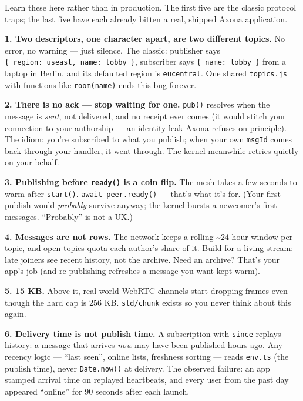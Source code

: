 \documentclass[
  nobib]{tufte-handout}
\begin{document}
Learn these here rather than in production. The first five are the
classic protocol traps; the last five have each already bitten a real,
shipped Axona application.

\textbf{1. Two descriptors, one character apart, are two different
topics.} No error, no warning --- just silence. The classic: publisher
says
\texttt{\{\ region:\ \textquotesingle{}useast\textquotesingle{},\ name:\ \textquotesingle{}lobby\textquotesingle{}\ \}},
subscriber says
\texttt{\{\ name:\ \textquotesingle{}lobby\textquotesingle{}\ \}} from a
laptop in Berlin, and its defaulted region is \texttt{eucentral}. One
shared \texttt{topics.js} with functions like \texttt{room(name)} ends
this bug forever.

\textbf{2. There is no ack --- stop waiting for one.} \texttt{pub()}
resolves when the message is \emph{sent}, not delivered, and no receipt
ever comes (it would stitch your connection to your authorship --- an
identity leak Axona refuses on principle). The idiom: you're subscribed
to what you publish; when your own \texttt{msgId} comes back through
your handler, it went through. The kernel meanwhile retries quietly on
your behalf.

\textbf{3. Publishing before \texttt{ready()} is a coin flip.} The mesh
takes a few seconds to warm after \texttt{start()}.
\texttt{await\ peer.ready()} --- that's what it's for. (Your first
publish would \emph{probably} survive anyway; the kernel bursts a
newcomer's first messages. ``Probably'' is not a UX.)

\textbf{4. Messages are not rows.} The network keeps a rolling
\textasciitilde24-hour window per topic, and open topics quota each
author's share of it. Build for a living stream: late joiners see recent
history, not the archive. Need an archive? That's your app's job (and
re-publishing refreshes a message you want kept warm).

\textbf{5. 15 KB.} Above it, real-world WebRTC channels start dropping
frames even though the hard cap is 256 KB. \texttt{std/chunk} exists so
you never think about this again.

\textbf{6. Delivery time is not publish time.} A subscription with
\texttt{since} replays history: a message that arrives \emph{now} may
have been published hours ago. Any recency logic --- ``last seen'',
online lists, freshness sorting --- reads \texttt{env.ts} (the publish
time), never \texttt{Date.now()} at delivery. The observed failure: an
app stamped arrival time on replayed heartbeats, and every user from the
past day appeared ``online'' for 90 seconds after each launch.
\end{document}
